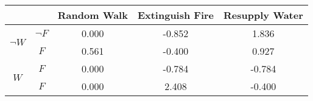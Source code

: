 \begin{center}
\begin{tabular}{|c|c|c|c|c|}
  \hline
  &   & Random Walk & Extinguish Fire & Resupply Water\\
  \hline
  \multirow{2}{*}{$\neg W$} & $\neg F$ & 0.000 & -0.852 & 1.836\\
  \cline{2-5}
   & $F$ & 0.561 & -0.400 & 0.927\\
  \hline
  \multirow{2}{*}{$W$} & $F$ & 0.000 & -0.784 & -0.784\\
  \cline{2-5}
   & $F$ & 0.000 & 2.408 & -0.400\\
  \hline
\end{tabular}
\end{center}
